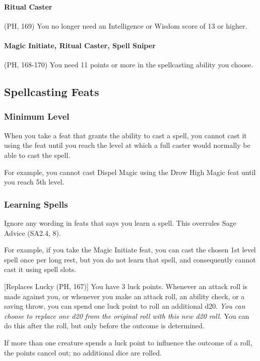 \documentclass[letterpaper,twocolumn,openany,nodeprecatedcode]{dndbook}
\begin{document}
\paragraph{Ritual Caster} (PH, 169) You no longer need an Intelligence or Wisdom score of 13 or higher.

\paragraph{Magic Initiate, Ritual Caster, Spell Sniper} (PH, 168-170) You need 11 points or more in the spellcasting ability you choose.

\subsection{Spellcasting Feats}

\subsubsection{Minimum Level}
When you take a feat that grants the ability to cast a spell, you cannot cast it using the feat until you reach the level at which a full caster would normally be able to cast the spell.

For example, you cannot cast Dispel Magic using the Drow High Magic feat until you reach 5th level.

\subsubsection{Learning Spells}
Ignore any wording in feats that says you learn a spell. This overrules Sage Advice (SA2.4, 8).

For example, if you take the Magic Initiate feat, you can cast the chosen 1st level spell once per long rest, but you do not learn that spell, and consequently cannot cast it using spell slots.

[Replaces Lucky (PH, 167)]
You have 3 luck points. Whenever an attack roll is made against you, or whenever you make an attack roll, an ability check, or a saving throw, you can spend one luck point to roll an additional d20. \textit{You can choose to replace one d20 from the original roll with this new d20 roll.} You can do this after the roll, but only before the outcome is determined.

If more than one creature spends a luck point to influence the outcome of a roll, the points cancel out; no additional dice are rolled.
\end{document}
